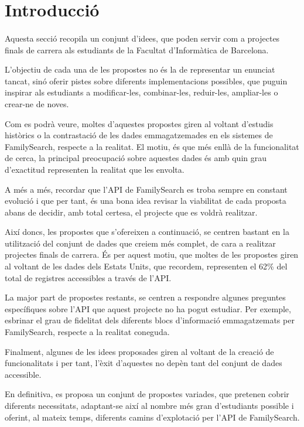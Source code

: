 \section{Introducció}

    \paragraph{}
    Aquesta secció recopila un conjunt d'idees, que poden servir com a projectes finals de carrera als estudiants de la Facultat d'Informàtica de Barcelona.

    L'objectiu de cada una de les propostes no és la de representar un enunciat tancat, sinó oferir pistes sobre diferents implementacions possibles, que puguin inspirar als estudiants a modificar-les, combinar-les, reduir-les, ampliar-les o crear-ne de noves.

    Com es podrà veure, moltes d'aquestes propostes giren al voltant d'estudis histò\-rics o la contrastació de les dades emmagatzemades en els sistemes de FamilySearch, res\-pec\-te a la realitat. El motiu, és que més enllà de la funcionalitat de cerca, la prin\-ci\-pal preocupació sobre aquestes dades és amb quin grau d'exactitud representen la realitat que les envolta.

    A més a més, recordar que l'API de FamilySearch es troba sempre en constant evolució i que per tant, és una bona idea revisar la viabilitat de cada proposta abans de decidir, amb total certesa, el projecte que es voldrà realitzar.

    Així doncs, les propostes que s’ofereixen a continuació, se centren bastant en la utilització del conjunt de dades que creiem més complet, de cara a realitzar projectes finals de carrera. És per aquest motiu, que moltes de les propostes giren al voltant de les dades dels Estats Units, que recordem, representen el 62\% del total de registres accessibles a través de l’API.

    La major part de propostes restants, se centren a respondre algunes preguntes específiques sobre l’API que aquest projecte no ha pogut estudiar. Per exemple, esbrinar el grau de fidelitat dels diferents blocs d’informació emmagatzemats per FamilySearch, respecte a la realitat coneguda.

    Finalment, algunes de les idees proposades giren al voltant de la creació de funcionalitats i per tant, l’èxit d’aquestes no depèn tant del conjunt de dades accessible.

    En definitiva, es proposa un conjunt de propostes variades, que pretenen cobrir diferents necessitats, adaptant-se així al nombre més gran d'estudiants possible i oferint, al mateix temps, diferents camins d'explotació per l'API de FamilySearch.
